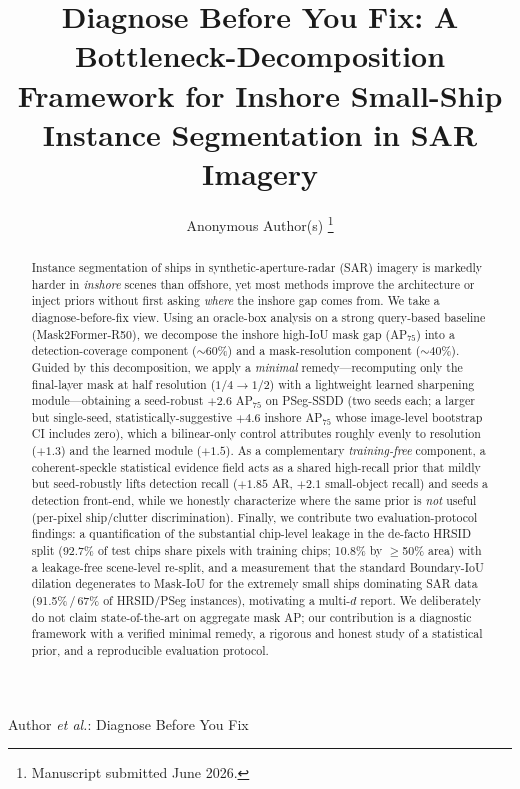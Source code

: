 \documentclass[journal]{IEEEtran}
\begin{document}
\title{Diagnose Before You Fix: A Bottleneck-Decomposition Framework for Inshore Small-Ship Instance Segmentation in SAR Imagery}

\author{Anonymous Author(s)%
\thanks{Manuscript submitted June 2026.}}

%
{Author \MakeLowercase{\textit{et al.}}: Diagnose Before You Fix}

\maketitle

\begin{abstract}
Instance segmentation of ships in synthetic-aperture-radar (SAR) imagery is markedly harder in \emph{inshore} scenes than offshore, yet most methods improve the architecture or inject priors without first asking \emph{where} the inshore gap comes from. We take a diagnose-before-fix view. Using an oracle-box analysis on a strong query-based baseline (Mask2Former-R50), we decompose the inshore high-IoU mask gap (AP$_{75}$) into a detection-coverage component ($\sim$60\%) and a mask-resolution component ($\sim$40\%). Guided by this decomposition, we apply a \emph{minimal} remedy---recomputing only the final-layer mask at half resolution ($1/4\!\rightarrow\!1/2$) with a lightweight learned sharpening module---obtaining a seed-robust $+2.6$ AP$_{75}$ on PSeg-SSDD (two seeds each; a larger but single-seed, statistically-suggestive $+4.6$ inshore AP$_{75}$ whose image-level bootstrap CI includes zero), which a bilinear-only control attributes roughly evenly to resolution ($+1.3$) and the learned module ($+1.5$). As a complementary \emph{training-free} component, a coherent-speckle statistical evidence field acts as a shared high-recall prior that mildly but seed-robustly lifts detection recall ($+1.85$ AR, $+2.1$ small-object recall) and seeds a detection front-end, while we honestly characterize where the same prior is \emph{not} useful (per-pixel ship/clutter discrimination). Finally, we contribute two evaluation-protocol findings: a quantification of the substantial chip-level leakage in the de-facto HRSID split (92.7\% of test chips share pixels with training chips; 10.8\% by $\ge$50\% area) with a leakage-free scene-level re-split, and a measurement that the standard Boundary-IoU dilation degenerates to Mask-IoU for the extremely small ships dominating SAR data (91.5\%\,/\,67\% of HRSID/PSeg instances), motivating a multi-$d$ report. We deliberately do not claim state-of-the-art on aggregate mask AP; our contribution is a diagnostic framework with a verified minimal remedy, a rigorous and honest study of a statistical prior, and a reproducible evaluation protocol.
\end{abstract}
\end{document}
